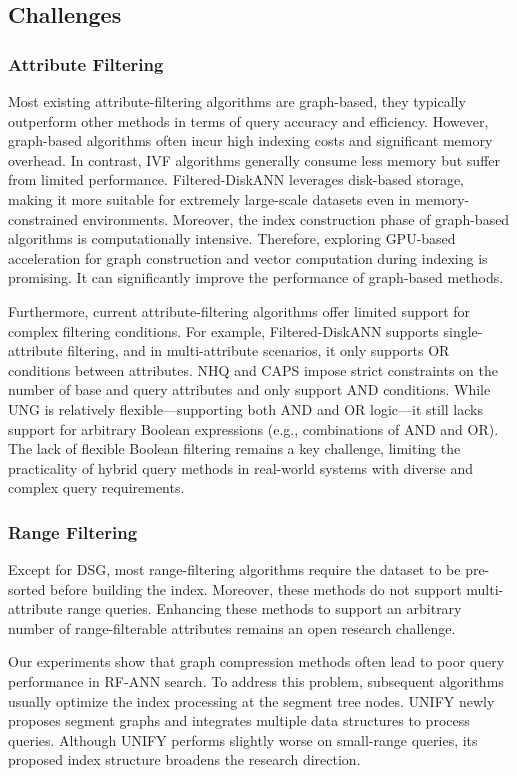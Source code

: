 \documentclass[sigconf, nonacm]{acmart}
\begin{document}
\subsection{Challenges}
\subsubsection{\textbf{Attribute Filtering}}
Most existing attribute-filtering algorithms are graph-based, they typically outperform other methods in terms of query accuracy and efficiency. However, graph-based algorithms often incur high indexing costs and significant memory overhead. In contrast, IVF algorithms generally consume less memory but suffer from limited performance. Filtered-DiskANN leverages disk-based storage, making it more suitable for extremely large-scale datasets even in memory-constrained environments. Moreover, the index construction phase of graph-based algorithms is computationally intensive. Therefore, exploring GPU-based acceleration for graph construction and vector computation during indexing is promising. It can significantly improve the performance of graph-based methods.

Furthermore, current attribute-filtering algorithms offer limited support for complex filtering conditions. For example, Filtered-DiskANN  supports single-attribute filtering, and in multi-attribute scenarios, it only supports OR conditions between attributes. 
NHQ and CAPS impose strict constraints on the number of base and query attributes and only support AND conditions. While UNG is relatively flexible—supporting both AND and OR logic—it still lacks support for arbitrary Boolean expressions (e.g., combinations of AND and OR). The lack of flexible Boolean filtering remains a key challenge, limiting the practicality of hybrid query methods in real-world systems with diverse and complex query requirements.

\subsubsection{\textbf{Range Filtering}}

Except for DSG, most range-filtering algorithms require the dataset to be pre-sorted before building the index. Moreover, these methods do not support multi-attribute range queries. Enhancing these methods to support an arbitrary number of range-filterable attributes remains an open research challenge.

Our experiments show that graph compression methods often lead to poor query performance in RF-ANN search. To address this problem, subsequent algorithms usually optimize the index processing at the segment tree nodes. UNIFY newly proposes segment graphs and integrates multiple data structures to process queries. Although UNIFY performs slightly worse on small-range queries, its proposed index structure broadens the research direction.
\end{document}

